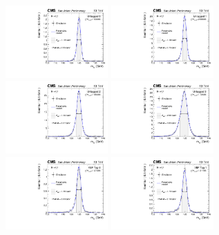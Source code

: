 \begin{figure}[ht!]
\centering
\includegraphics[width=0.35\textwidth]{modellingFigures/DCBpG/UntaggedTag_0.pdf} 
\includegraphics[width=0.35\textwidth]{modellingFigures/DCBpG/UntaggedTag_1.pdf} \\
\includegraphics[width=0.35\textwidth]{modellingFigures/DCBpG/UntaggedTag_2.pdf} 
\includegraphics[width=0.35\textwidth]{modellingFigures/DCBpG/UntaggedTag_3.pdf} \\ 
\includegraphics[width=0.35\textwidth]{modellingFigures/DCBpG/VBFTag_0.pdf} 
\includegraphics[width=0.35\textwidth]{modellingFigures/DCBpG/VBFTag_1.pdf} \\

\end{figure}
